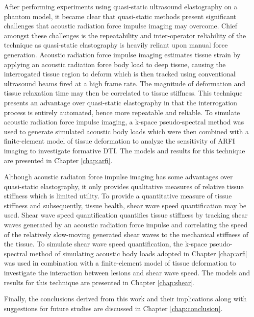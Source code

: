 		After performing experiments using quasi-static ultrasound elastography on a phantom model, it became clear that quasi-static methods present significant challenges that acoustic radiation force impulse imaging may overcome. Chief amongst these challenges is the repeatability and inter-operator reliability of the technique as quasi-static elastography is heavily reliant upon manual force generation. Acoustic radiation force impulse imaging estimates tissue strain by applying an acoustic radiation force body load to deep tissue, causing the interrogated tissue region to deform which is then tracked using conventional ultrasound beams fired at a high frame rate. The magnitude of deformation and tissue relaxation time may then be correlated to tissue stiffness. This technique presents an advantage over quasi-static elastography in that the interrogation process is entirely automated, hence more repeatable and reliable. To simulate acoustic radiation force impulse imaging, a k-space pseudo-spectral method was used to generate simulated acoustic body loads which were then combined with a finite-element model of tissue deformation to analyze the sensitivity of ARFI imaging to investigate formative DTI. The models and results for this technique are presented in Chapter \ref{chap:arfi}.

		Although acoustic radiaton force impulse imaging has some advantages over quasi-static elastography, it only provides qualitative measures of relative tissue stiffness which is limited utility. To provide a quantitative measure of tissue stiffness and subsequently, tissue health, shear wave speed quantification may be used. Shear wave speed quantification quantifies tissue stiffness by tracking shear waves generated by an acoustic radiation force impulse and correlating the speed of the relatively slow-moving generated shear waves to the mechanical stiffness of the tissue. To simulate shear wave speed quantification, the k-space pseudo-spectral method of simulating acoustic body loads adopted in Chapter \ref{chap:arfi} was used in combination with a finite-element model of tissue deformation to investigate the interaction between lesions and shear wave speed. The models and results for this technique are presented in Chapter \ref{chap:shear}.

		Finally, the conclusions derived from this work and their implications along with suggestions for future studies are discussed in Chapter \ref{chap:conclusion}.

